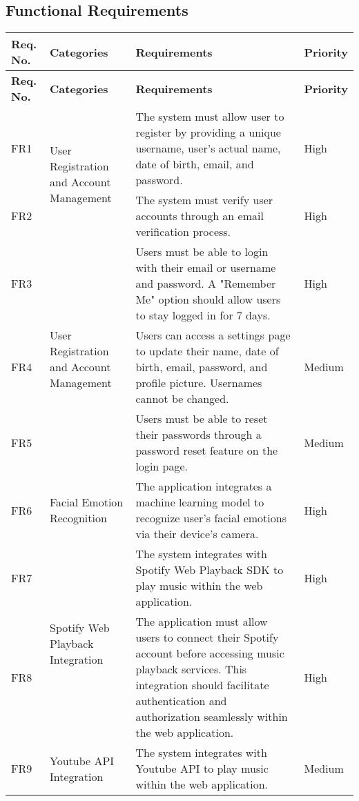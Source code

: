 \subsection{Functional Requirements}
\begin{longtable}{ |m{1cm}|m{3.5cm}|m{7cm}|m{1.5cm}| }
    \hline
    \rowcolor{lightgray}
    \textbf{Req. No.} & \textbf{Categories} & \textbf{Requirements} & \textbf{Priority} \\
    \hline
    \endfirsthead

    \hline
    \rowcolor{lightgray}
    \textbf{Req. No.} & \textbf{Categories} & \textbf{Requirements} & \textbf{Priority} \\
    \hline
    \endhead
    FR1 & \multirow{2}{=}{User Registration and Account Management} & The system must allow user to register by providing a unique username, user's actual name, date of birth, email, and password. & High \\
    \cline{1-1} \cline{3-4}
    FR2 &  & The system must verify user accounts through an email verification process. & High \\
    \hline
    FR3 & \multirow{3}{=}{User Registration and Account Management} & Users must be able to login with their email or username and password. A "Remember Me" option should allow users to stay logged in for 7 days. & High \\
    \cline{1-1} \cline{3-4}
    FR4 &  & Users can access a settings page to update their name, date of birth, email, password, and profile picture. Usernames cannot be changed. & Medium \\
    \cline{1-1} \cline{3-4}
    FR5 &  & Users must be able to reset their passwords through a password reset feature on the login page. & Medium \\
    \hline
    FR6 & Facial Emotion Recognition & The application integrates a machine learning model to recognize user's facial emotions via their device's camera. & High \\
    \hline
    FR7 & \multirow{2}{=}{Spotify Web Playback Integration} & The system integrates with Spotify Web Playback SDK to play music within the web application. & High \\
    \cline{1-1} \cline{3-4}
    FR8 &  & The application must allow users to connect their Spotify account before accessing music playback services. This integration should facilitate authentication and authorization seamlessly within the web application. & High \\
    \hline
    FR9 & Youtube API Integration & The system integrates with Youtube API to play music within the web application. & Medium \\

\end{longtable}
